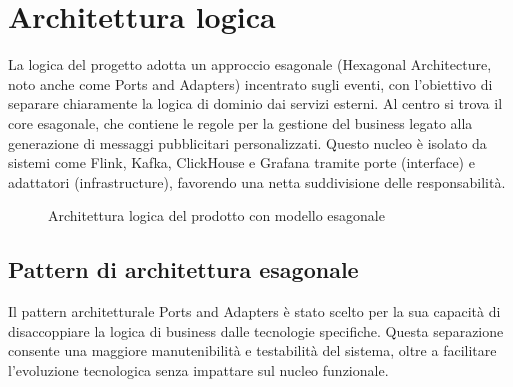 \documentclass[10pt]{article}
\newcommand{\myparagraph}[1]{\paragraph{#1}\mbox{}\\}
\begin{document}
    
    
    

    \section{Architettura logica}

    La logica del progetto adotta un approccio esagonale (Hexagonal Architecture, noto anche come Ports and Adapters) incentrato sugli eventi, con l'obiettivo di separare chiaramente la logica di dominio dai servizi esterni. Al centro si trova il core esagonale, che contiene le regole per la gestione del business legato alla generazione di messaggi pubblicitari personalizzati. Questo nucleo è isolato da sistemi come Flink, Kafka, ClickHouse e Grafana tramite porte (interface) e adattatori (infrastructure), favorendo una netta suddivisione delle responsabilità.

    \begin{figure}[h]
    \centering
    \caption{Architettura logica del prodotto con modello esagonale}
    \end{figure}

    \subsection{Pattern di architettura esagonale}
    
    Il pattern architetturale Ports and Adapters è stato scelto per la sua capacità di disaccoppiare la logica di business dalle tecnologie specifiche. Questa separazione consente una maggiore manutenibilità e testabilità del sistema, oltre a facilitare l'evoluzione tecnologica senza impattare sul nucleo funzionale.
    
\end{document}

